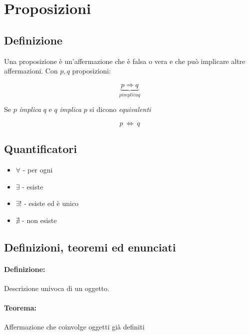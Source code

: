 \section{Proposizioni}
    \subsection{Definizione}
        Una proposizione è un'affermazione che è falsa o vera e che può implicare altre affermazioni.
        Con $p, q$ proposizioni:

        \begin{LARGE}
            \begin{equation*}
                \underbrace{p \Rightarrow q}_{p \textit{implica} q}
            \end{equation*}
        \end{LARGE}
        Se $p$ \textit{implica} $q$ e $q$ \textit{implica} $p$ si dicono \textit{equivalenti}\newline
        \begin{LARGE}
            \begin{equation*}
                p\ \iff\ q
            \end{equation*}
        \end{LARGE}
        \subsection{Quantificatori}
            \begin{itemize}
                \item $\forall$ - per ogni
                \item $\exists$ - esiste
                \item $\exists!$ - esiste ed è unico
                \item $\nexists$ - non esiste
            \end{itemize}
        \subsection{Definizioni, teoremi ed enunciati}
        \paragraph{Definizione:\\ }
            Descrizione univoca di un oggetto.
        \paragraph{Teorema:\\ }
            Affermazione che coinvolge oggetti già definiti
